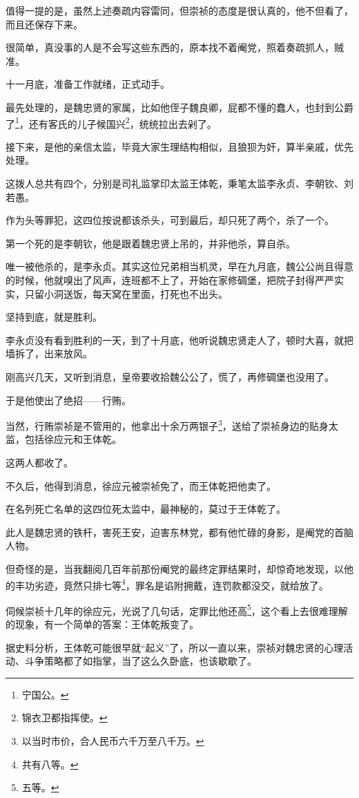 \begin{multicols}{\theparacolNo}
值得一提的是，虽然上述奏疏内容雷同，但崇祯的态度是很认真的，他不但看了，而且还保存下来。

很简单，真没事的人是不会写这些东西的，原本找不着阉党，照着奏疏抓人，贼准。

十一月底，准备工作就绪，正式动手。

最先处理的，是魏忠贤的家属，比如他侄子魏良卿，屁都不懂的蠢人，也封到公爵了\footnote{宁国公。}，还有客氏的儿子候国兴\footnote{锦衣卫都指挥使。}，统统拉出去剁了。

接下来，是他的亲信太监，毕竟大家生理结构相似，且狼狈为奸，算半亲戚，优先处理。

这拨人总共有四个，分别是司礼监掌印太监王体乾，秉笔太监李永贞、李朝钦、刘若愚。

作为头等罪犯，这四位按说都该杀头，可到最后，却只死了两个，杀了一个。

第一个死的是李朝钦，他是跟着魏忠贤上吊的，并非他杀，算自杀。

唯一被他杀的，是李永贞。其实这位兄弟相当机灵，早在九月底，魏公公尚且得意的时候，他就嗅出了风声，连班都不上了，开始在家修碉堡，把院子封得严严实实，只留小洞送饭，每天窝在里面，打死也不出头。

坚持到底，就是胜利。

李永贞没有看到胜利的一天，到了十月底，他听说魏忠贤走人了，顿时大喜，就把墙拆了，出来放风。

刚高兴几天，又听到消息，皇帝要收拾魏公公了，慌了，再修碉堡也没用了。

于是他使出了绝招——行贿。

当然，行贿崇祯是不管用的，他拿出十余万两银子\footnote{以当时市价，合人民币六千万至八千万。}，送给了崇祯身边的贴身太监，包括徐应元和王体乾。

这两人都收了。

不久后，他得到消息，徐应元被崇祯免了，而王体乾把他卖了。

在名列死亡名单的这四位死太监中，最神秘的，莫过于王体乾了。

此人是魏忠贤的铁杆，害死王安，迫害东林党，都有他忙碌的身影，是阉党的首脑人物。

但奇怪的是，当我翻阅几百年前那份阉党的最终定罪结果时，却惊奇地发现，以他的丰功劣迹，竟然只排七等\footnote{共有八等。}，罪名是谄附拥戴，连罚款都没交，就给放了。

伺候崇祯十几年的徐应元，光说了几句话，定罪比他还高\footnote{五等。}，这个看上去很难理解的现象，有一个简单的答案：王体乾叛变了。

据史料分析，王体乾可能很早就“起义”了，所以一直以来，崇祯对魏忠贤的心理活动、斗争策略都了如指掌，当了这么久卧底，也该歇歇了。


\end{multicols}

